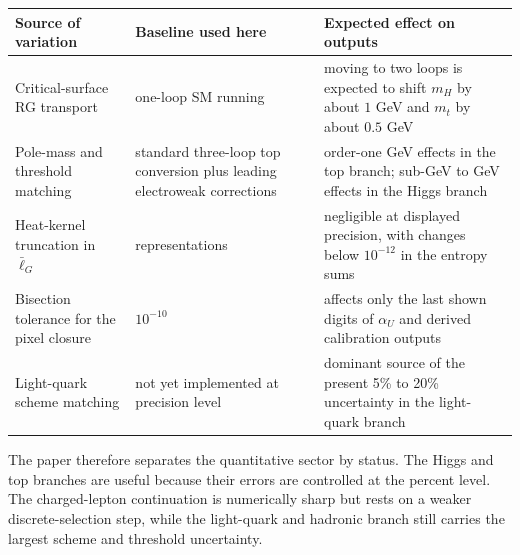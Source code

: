 \documentclass[11pt]{article}
\begin{document}
\begingroup
\footnotesize
\begin{tabular}{@{}>{\raggedright\arraybackslash}p{}>{\raggedright\arraybackslash}p{}>{\raggedright\arraybackslash}p{}@{}}
\toprule
Source of variation & Baseline used here & Expected effect on outputs \\
\midrule
Critical-surface RG transport & one-loop SM running & moving to two loops is expected to shift $m_H$ by about $1$ GeV and $m_t$ by about $0.5$ GeV \\
Pole-mass and threshold matching & standard three-loop top conversion plus leading electroweak corrections & order-one GeV effects in the top branch; sub-GeV to GeV effects in the Higgs branch \\
Heat-kernel truncation in $\bar\ell_G$ & 200 representations & negligible at displayed precision, with changes below $10^{-12}$ in the entropy sums \\
Bisection tolerance for the pixel closure & $10^{-10}$ & affects only the last shown digits of $\alpha_U$ and derived calibration outputs \\
Light-quark scheme matching & not yet implemented at precision level & dominant source of the present 5\% to 20\% uncertainty in the light-quark branch \\
\bottomrule
\end{tabular}
\endgroup

The paper therefore separates the quantitative sector by status. The Higgs and top branches are useful because their errors are controlled at the percent level. The charged-lepton continuation is numerically sharp but rests on a weaker discrete-selection step, while the light-quark and hadronic branch still carries the largest scheme and threshold uncertainty.
\end{document}
